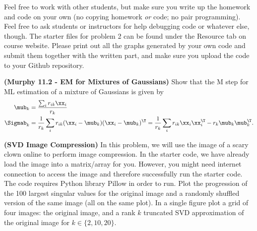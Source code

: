 \documentclass[12pt,letterpaper,fleqn]{hmcpset}
\begin{document}
Feel free to work with other students, but make sure you write up the homework
and code on your own (no copying homework \textit{or} code; no pair programming).
Feel free to ask students or instructors for help debugging code or whatever else,
though.
\newline
\newline
The starter files for problem 2 can be found under the Resource tab on course website. Please print out all the graphs generated by your own code and submit them together with the written part, and make sure you upload the code to your Github repository.\\

\begin{problem}[1]
	\textbf{(Murphy 11.2 - EM for Mixtures of Gaussians)} Show that the M step for ML
	estimation of a mixture of Gaussians is given by
	\begin{align*}
		\mub_k    & = \frac{\sum_i r_{ik}\xx_i}{r_k}                                                                                                \\
		\Sigmab_k & = \frac{1}{r_k}\sum_i r_{ik}(\xx_i - \mub_k)(\xx_i - \mub_k)^\T = \frac{1}{r_k}\sum_i r_{ik}\xx_i\xx_i^\T - r_k\mub_k\mub_k^\T.
	\end{align*}
\end{problem}
\begin{solution}
	\vfill
\end{solution}
\newpage



\begin{problem}[2]
	\textbf{(SVD Image Compression)}
	In this problem, we will use the image of a scary clown online to perform image compression.  In the starter code, we have already load the image into a matrix/array for you. However, you might need internet connection to access the image and therefore successfully run the starter code. The code requires Python library Pillow in order to run.
	\newline
	\newline
	Plot the progression of the 100 largest singular values for the original image
	and a randomly shuffled version of the same image (all on the same plot). In a single figure plot
	a grid of four images: the original image, and a rank $k$ truncated SVD approximation of the original
	image for $k\in\{2,10,20\}$.

\end{problem}
\begin{solution}
	\vfill
\end{solution}
\newpage
\end{document}
